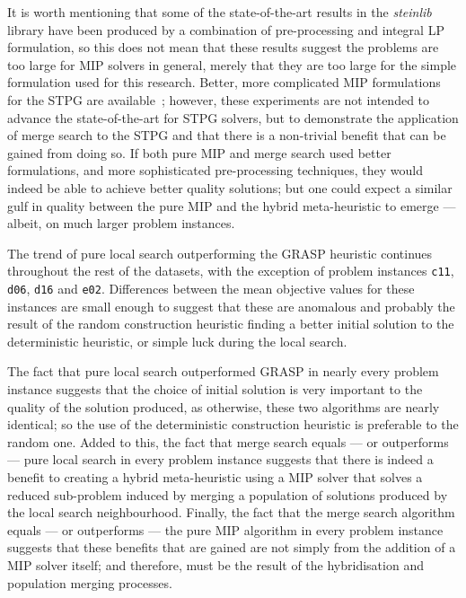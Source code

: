 \documentclass[authoryear,11pt,square,number,times,super,comma]{elsarticle}
\begin{document}
It is worth mentioning that some of the state-of-the-art results in the \emph{steinlib} library have been produced by a combination of pre-processing and integral LP formulation, so this does not mean that these results suggest the problems are too large for MIP solvers in general, merely that they are too large for the simple formulation used for this research. Better, more complicated MIP formulations for the STPG are available~\citep{goemans,stpg-improved,hypergraph}; however, these experiments are not intended to advance the state-of-the-art for STPG solvers, but to demonstrate the application of merge search to the STPG and that there is a non-trivial benefit that can be gained from doing so. If both pure MIP and merge search used better formulations, and more sophisticated pre-processing techniques, they would indeed be able to achieve better quality solutions; but one could expect a similar gulf in quality between the pure MIP and the hybrid meta-heuristic to emerge --- albeit, on much larger problem instances.

The trend of pure local search outperforming the GRASP heuristic continues throughout the rest of the datasets, with the exception of problem instances \texttt{c11}, \texttt{d06}, \texttt{d16} and \texttt{e02}. Differences between the mean objective values for these instances are small enough to suggest that these are anomalous and probably the result of the random construction heuristic finding a better initial solution to the deterministic heuristic, or simple luck during the local search. 

The fact that pure local search outperformed GRASP in nearly every problem instance suggests that the choice of initial solution is very important to the quality of the solution produced, as otherwise, these two algorithms are nearly identical; so the use of the deterministic construction heuristic is preferable to the random one. Added to this, the fact that merge search equals --- or outperforms --- pure local search in every problem instance suggests that there is indeed a benefit to creating a hybrid meta-heuristic using a MIP solver that solves a reduced sub-problem induced by merging a population of solutions produced by the local search neighbourhood. Finally, the fact that the merge search algorithm equals --- or outperforms --- the pure MIP algorithm in every problem instance suggests that these benefits that are gained are not simply from the addition of a MIP solver itself; and therefore, must be the result of the hybridisation and population merging processes.
\end{document}
